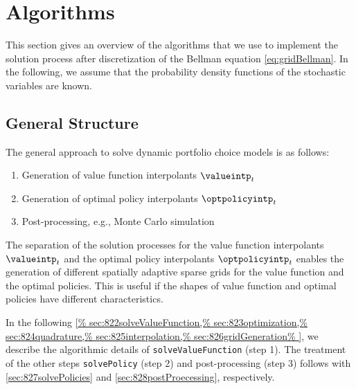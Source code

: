 \breakpagebeforenextheadingtrue
\section{Algorithms}
\label{sec:82algorithms}


\noindent
This section gives an overview of the algorithms that
we use to implement the solution process after discretization of
the Bellman equation \eqref{eq:gridBellman}.
In the following, we assume that the probability density functions of the
stochastic variables are known.



\subsection{General Structure}
\label{sec:821generalStructure}

The general approach to solve dynamic portfolio choice models is as follows:
\begin{enumerate}
  \item
  Generation of value function interpolants $\valueintp_t$
  
  \item
  Generation of optimal policy interpolants $\optpolicyintp_t$
  
  \item
  Post-processing, e.g., Monte Carlo simulation
\end{enumerate}
The separation of the solution processes for
the value function interpolants $\valueintp_t$
and the optimal policy interpolants $\optpolicyintp_t$
enables the generation of different spatially adaptive sparse grids
for the value function and the optimal policies.
This is useful if the shapes of value function and optimal policies
have different characteristics.

In the following \cref{%
  sec:822solveValueFunction,%
  sec:823optimization,%
  sec:824quadrature,%
  sec:825interpolation,%
  sec:826gridGeneration%
}, we describe the algorithmic details of
\texttt{solveValueFunction} (step 1).
The treatment of the other steps \texttt{solvePolicy} (step 2) and
post-processing (step 3) follows with
\cref{sec:827solvePolicies} and \cref{sec:828postProecessing},
respectively.


